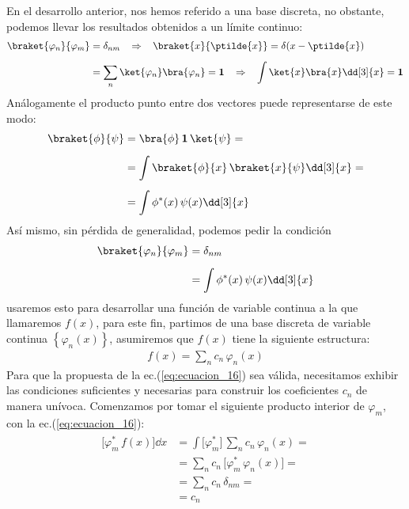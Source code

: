 En el desarrollo anterior, nos hemos referido a una base discreta, no obstante, podemos llevar los resultados obtenidos a un límite continuo:
\begin{align}
\begin{aligned}[b]
\braket{\varphi_{n}}{\varphi_{m}} &= \delta_{nm} \hspace{0.3cm} \Rightarrow \hspace{0.3cm} \braket{x}{\ptilde{x}} = \delta(x - \ptilde{x}) \\[0.5em]
&= \sum_{n} \ket{\varphi_{n}} \bra{\varphi_{n}} = \mathbf{1} \hspace{0.3cm} \Rightarrow \hspace{0.3cm} \int \ket{x} \bra{x} \dd[3]{x} = \mathbf{1}
\end{aligned}
\label{eq:ecuacion_14}
\end{align}
Análogamente el producto punto entre dos vectores puede representarse de este modo:
\begin{align}
\begin{aligned}[b]
\braket{\phi}{\psi} &= \bra{\phi} \, \mathbf{1} \, \ket{\psi} = \\[0.5em]
&= \int \braket{\phi}{x} \, \braket{x}{\psi} \dd[3]{x} = \\[0.5em]
&= \int \phi^{*}(x) \, \psi (x) \dd[3]{x}
\end{aligned}
\label{eq:ecuacion_15}
\end{align}
Así mismo, sin pérdida de generalidad, podemos pedir la condición
\begin{align*}
\braket{\varphi_{n}}{\varphi_{m}} &= \delta_{nm} \\[0.5em]
&= \int \phi^{*}(x) \, \psi (x) \dd[3]{x}
\end{align*}
usaremos esto para desarrollar una función de variable continua a la que llamaremos $f(x)$, para este fin, partimos de una base discreta de variable continua $\left\{ \varphi_{n}(x) \right\}$, asumiremos que $f(x)$ tiene la siguiente estructura:
\begin{align}
f(x) = \sum_{n} c_{n} \, \varphi_{n}(x)
\label{eq:ecuacion_16}
\end{align}
Para que la propuesta de la ec.(\ref{eq:ecuacion_16}) sea válida, necesitamos exhibir las condiciones suficientes y necesarias para construir los coeficientes $c_{n}$ de manera unívoca. Comenzamos por tomar el siguiente producto interior de $\varphi_{m}$, con la ec.(\ref{eq:ecuacion_16}):
\begin{align}
\begin{aligned}
\bigg[ \varphi_{m}^{*} \, f(x) \bigg] \dd{x} &= \int \bigg[ \varphi_{m}^{*} \bigg] \, \sum_{n} c_{n} \, \varphi_{n} (x) = \\[0.5em]
&= \sum_{n} c_{n} \, \bigg[ \varphi_{m}^{*} \, \varphi_{n} (x) \bigg] = \\[0.5em]
&= \sum_{n} c_{n} \, \delta_{nm} = \\[0.5em]
&= c_{n}
\end{aligned}
\label{eq:ecuacion_17}
\end{align}
